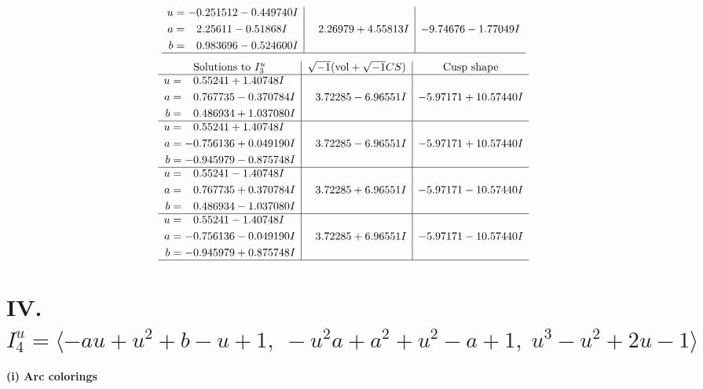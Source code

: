 \documentclass[1p]{elsarticle_modified}
\theoremstyle{definition}
\newcommand{\I}{\sqrt{-1}}
\begin{document}
$$\begin{array}{c|c|c}
\begin{aligned}
u &= -0.251512 - 0.449740 I \\
a &= \phantom{-}2.25611 - 0.51868 I \\
b &= \phantom{-}0.983696 - 0.524600 I\end{aligned}
 & \phantom{-}2.26979 + 4.55813 I & -9.74676 - 1.77049 I\\
 \hline 
 \end{array}$$\newpage$$\begin{array}{c|c|c}  
\text{Solutions to }I^u_{3}& \I (\text{vol} + \sqrt{-1}CS) & \text{Cusp shape}\\
 \hline 
\begin{aligned}
u &= \phantom{-}0.55241 + 1.40748 I \\
a &= \phantom{-}0.767735 - 0.370784 I \\
b &= \phantom{-}0.486934 + 1.037080 I\end{aligned}
 & \phantom{-}3.72285 - 6.96551 I & -5.97171 + 10.57440 I \\ \hline\begin{aligned}
u &= \phantom{-}0.55241 + 1.40748 I \\
a &= -0.756136 + 0.049190 I \\
b &= -0.945979 - 0.875748 I\end{aligned}
 & \phantom{-}3.72285 - 6.96551 I & -5.97171 + 10.57440 I \\ \hline\begin{aligned}
u &= \phantom{-}0.55241 - 1.40748 I \\
a &= \phantom{-}0.767735 + 0.370784 I \\
b &= \phantom{-}0.486934 - 1.037080 I\end{aligned}
 & \phantom{-}3.72285 + 6.96551 I & -5.97171 - 10.57440 I \\ \hline\begin{aligned}
u &= \phantom{-}0.55241 - 1.40748 I \\
a &= -0.756136 - 0.049190 I \\
b &= -0.945979 + 0.875748 I\end{aligned}
 & \phantom{-}3.72285 + 6.96551 I & -5.97171 - 10.57440 I\\
 \hline 
 \end{array}$$\newpage\newpage\renewcommand{\arraystretch}{1}
\centering \section*{IV. $I^u_{4}= \langle - a u+u^2+b- u+1,\;- u^2 a+a^2+u^2- a+1,\;u^3- u^2+2 u-1 \rangle$}
\flushleft \textbf{(i) Arc colorings}\\
\end{document}
